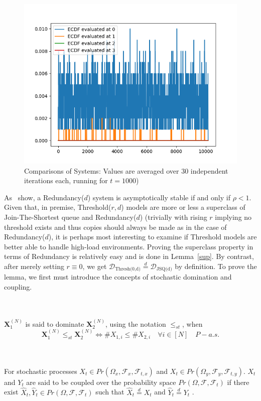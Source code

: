 \begin{figure}
    \centering
    \includegraphics[width=0.7\linewidth]{attimes.png} %
    \caption{Comparisons of Systems: Values are averaged over 30 independent iterations each, running for $t=1000$)}
    \label{fig:img}
\end{figure}

As~\cite{gardner_redundancy-d_2017} show, a Redundancy($d$) system is asymptotically stable if and only if $\rho < 1 $. Given that, in premise, Threshold($r,d$) models are more or less a superclass of Join-The-Shortest queue and Redundancy($d$) (trivially with rising $r$  implying no threshold exists and thus copies should always be made as in the case of Redundancy($d$), it is perhaps most interesting to examine if Threshold models are better able to handle high-load environments. Proving the superclass property in terms of Redundancy is relatively easy and is done in Lemma~\ref{sup}. By contrast, after merely setting $r \equiv 0$, we get $ \mathcal{D}_{\text{Thresh(0,d)}} \overset{d}{=} \mathcal{D}_{\text{JSQ(d)}}$ by definition. To prove the lemma, we first must introduce the concepts of stochastic domination and coupling.
\begin{definition}
    \\~\\
    $\mathbf{X}_{1}^{(N)}$ is said to dominate $\mathbf{X}_{2}^{(N)}$, using the notation $\leq_{st}$, when ~\cite{bramson_asymptotic_2012}
    \[\mathbf{X}_{1}^{(N)}\leq_{st}\mathbf{X}_{2}^{(N)} \iff\# X_{1,i} \leq \# X_{2,i}  \quad \forall i \in [N] \quad P-a.s.\]
\end{definition}

\begin{definition}
        \label{coupled}
    \\~\\
    For stochastic processes $X_{t} \in Pr(\Omega_{x}, \mathcal{F}_{x}, \mathcal{F}_{t,x})$ and $X_{t} \in Pr(\Omega_{y}, \mathcal{F}_{y}, \mathcal{F}_{t,y})$.
    $X_{t}$ and $Y_{t}$ are said to be coupled over the probability space $Pr(\Omega, \mathcal{F}, \mathcal{F}_{t})$ if there exist
    $\hat X_{t}, \hat Y_{t} \in Pr(\Omega, \mathcal{F}, \mathcal{F}_{t})$ such that $\hat X_{t} \overset{d}{=}X_{t}$ and $\hat Y_{t} \overset{d}{=}Y_{t}$ \cite{bramson_asymptotic_2012}.
\end{definition}

